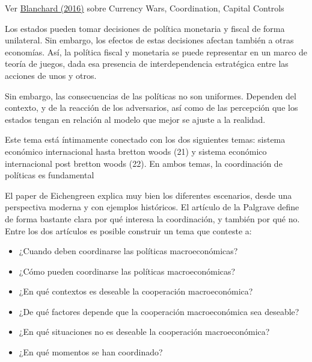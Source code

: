 \documentclass{nuevotema}
\begin{document}
\ideaclave

Ver \href{https://www.piie.com/system/files/documents/wp16-9.pdf}{Blanchard (2016)} sobre Currency Wars, Coordination, Capital Controls

Los estados pueden tomar decisiones de política monetaria y fiscal de forma unilateral. Sin embargo, los efectos de estas decisiones afectan también a otras economías. Así, la política fiscal y monetaria se puede representar en un marco de teoría de juegos, dada esa presencia de interdependencia estratégica entre las acciones de unos y otros.

Sin embargo, las consecuencias de las políticas no son uniformes. Dependen del contexto, y de la reacción de los adversarios, así como de las percepción que los estados tengan en relación al modelo que mejor se ajuste a la realidad.

Este tema está íntimamente conectado con los dos siguientes temas: sistema económico internacional hasta bretton woods (21) y sistema económico internacional post bretton woods (22). En ambos temas, la coordinación de políticas es fundamental

El paper de Eichengreen explica muy bien los diferentes escenarios, desde una perspectiva moderna y con ejemplos históricos. El artículo de la Palgrave define de forma bastante clara por qué interesa la coordinación, y también por qué no. Entre los dos artículos es posible construir un tema que conteste a:

\begin{itemize}
    \item ¿Cuando deben coordinarse las políticas macroeconómicas?
    \item ¿Cómo pueden coordinarse las políticas macroeconómicas?
    \item ¿En qué contextos es deseable la cooperación macroeconómica?
    \item ¿De qué factores depende que la cooperación macroeconómica sea deseable?
    \item ¿En qué situaciones no es deseable la cooperación macroeconómica?
    \item ¿En qué momentos se han coordinado?

\end{itemize}

\esquemacorto
\end{document}
